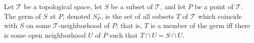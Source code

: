 Let $\mathcal{T}$ be a topological space, let $S$ be a subset of $\mathcal{T}$, and let $P$ be a point of $\mathcal{T}$. The germ of $S$ at $P$, denoted $S_P^\sim$, is the set of all subsets $T$ of $\mathcal{T}$ which coincide with $S$ on some $\mathcal{T}$-neighborhood of $P$; that is, $T$ is a member of the germ iff there is some open neighborhood $U$ of $P$ such that $T \cap U = S \cap U$.
